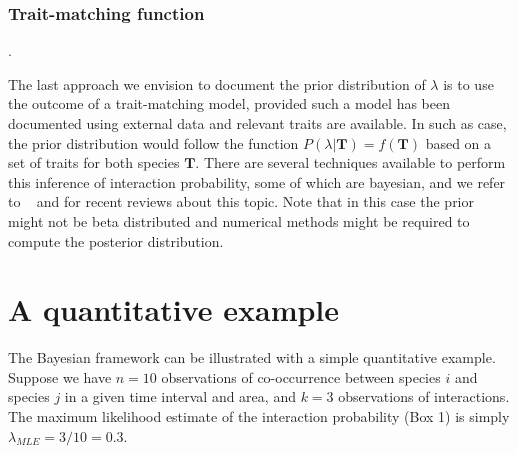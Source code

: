 \documentclass[12pt]{article}
\begin{document}
      \subsubsection*{Trait-matching function}. 


          The last approach we envision to document the prior distribution of $\lambda$ is to use the outcome of a trait-matching model, provided such a model has been documented using external data and relevant traits are available. 
          In such as case, the prior distribution would follow the function $P(\lambda|\mathbf{T})=f(\mathbf{T})$ based on a set of traits for both species $\mathbf{T}$. There are several techniques available to perform this inference of interaction probability, some of which are bayesian, and we refer to ~\citep{Bartomeus2016} and \citep{Weinstein2017} for recent reviews about this topic. Note that in this case the prior might not be beta distributed and numerical methods might be required to compute the posterior distribution.  


\section*{A quantitative example}


  The Bayesian framework can be illustrated with a simple quantitative example. Suppose we have $n = 10$ observations of co-occurrence between species $i$ and species $j$ in a given time interval and area, and $k = 3$ observations of interactions. The maximum likelihood estimate of the interaction probability (Box 1) is simply $\lambda_{MLE} = 3/10 = 0.3$. 
  
\end{document}
